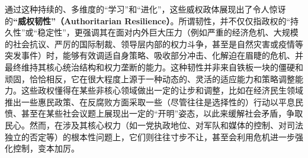 \documentclass[UTF8, 10pt]{ctexbook}
\begin{document}
通过这种持续的、多维度的“学习”和“进化”，这些威权政体展现出了令人惊讶的\textbf{“威权韧性”（Authoritarian Resilience）}。所谓韧性，并不仅仅指政权的“持久性”或“稳定性”，更强调其在面对内外巨大压力（例如严重的经济危机、大规模的社会抗议、严厉的国际制裁、领导层内部的权力斗争，甚至是自然灾害或疫情等突发事件）时，能够有效调适自身策略、吸收部分冲击、化解迫在眉睫的危机、并最终维持其核心统治结构和权力垄断的能力。这种韧性并非来自铁板一块的僵硬和顽固，恰恰相反，它在很大程度上源于一种动态的、灵活的适应能力和策略调整能力。这些政权懂得在某些非核心领域做出一定的让步和调整，比如在经济民生领域推出一些惠民政策、在反腐败方面采取一些（尽管往往是选择性的）行动以平息民愤、甚至在某些社会议题上展现出一定的“开明”姿态，以此来缓解社会矛盾，争取民心。然而，在涉及其核心权力（如一党执政地位、对军队和媒体的控制、对司法独立的否定等）的根本性问题上，它们则往往寸步不让，甚至会利用危机进一步强化控制，变本加厉。
\end{document}
